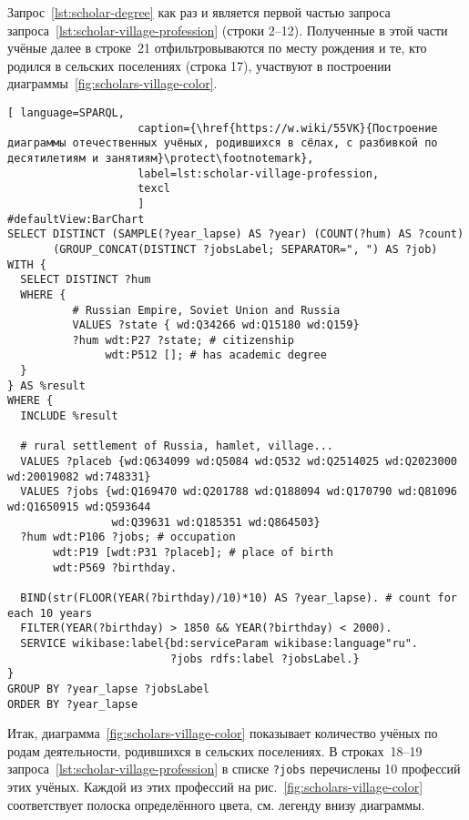Запрос~\ref{lst:scholar-degree} как раз и является 
первой частью запроса запроса~\ref{lst:scholar-village-profession} (строки 2--12). 
Полученные в этой части учёные далее в строке~21 
отфильтровываются по месту рождения и те, кто родился в сельских поселениях (строка 17), 
участвуют в построении диаграммы~\ref{fig:scholars-village-color}.

\begin{fullwidth}
\begin{lstlisting}[ language=SPARQL, 
                    caption={\href{https://w.wiki/55VK}{Построение диаграммы отечественных учёных, родившихся в сёлах, с разбивкой по десятилетиям и занятиям}\protect\footnotemark},
                    label=lst:scholar-village-profession,
                    texcl 
                    ]
#defaultView:BarChart
SELECT DISTINCT (SAMPLE(?year_lapse) AS ?year) (COUNT(?hum) AS ?count) 
       (GROUP_CONCAT(DISTINCT ?jobsLabel; SEPARATOR=", ") AS ?job) 
WITH {
  SELECT DISTINCT ?hum 
  WHERE {
          # Russian Empire, Soviet Union and Russia
          VALUES ?state { wd:Q34266 wd:Q15180 wd:Q159}
          ?hum wdt:P27 ?state; # citizenship
               wdt:P512 []; # has academic degree 
  }
} AS %result
WHERE {
  INCLUDE %result

  # rural settlement of Russia, hamlet, village...
  VALUES ?placeb {wd:Q634099 wd:Q5084 wd:Q532 wd:Q2514025 wd:Q2023000 wd:20019082 wd:748331}
  VALUES ?jobs {wd:Q169470 wd:Q201788 wd:Q188094 wd:Q170790 wd:Q81096 wd:Q1650915 wd:Q593644 
                wd:Q39631 wd:Q185351 wd:Q864503}
  ?hum wdt:P106 ?jobs; # occupation
       wdt:P19 [wdt:P31 ?placeb]; # place of birth
       wdt:P569 ?birthday.
  
  BIND(str(FLOOR(YEAR(?birthday)/10)*10) AS ?year_lapse). # count for each 10 years
  FILTER(YEAR(?birthday) > 1850 && YEAR(?birthday) < 2000).
  SERVICE wikibase:label{bd:serviceParam wikibase:language"ru".
                         ?jobs rdfs:label ?jobsLabel.}
}
GROUP BY ?year_lapse ?jobsLabel
ORDER BY ?year_lapse
\end{lstlisting}%
\end{fullwidth}

Итак, диаграмма~\ref{fig:scholars-village-color} показывает количество учёных по родам деятельности, 
родившихся в сельских поселениях. 
В строках~18--19 запроса~\ref{lst:scholar-village-profession} 
в списке \lstinline|?jobs| перечислены 10 профессий этих учёных. 
%
%
Каждой из этих профессий на рис.~\ref{fig:scholars-village-color} 
соответствует полоска определённого цвета, см. легенду внизу диаграммы. 

